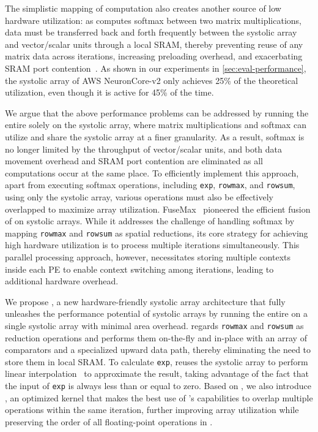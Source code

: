 The simplistic mapping of computation also creates another source of low hardware utilization:
as \FA{} computes softmax between two matrix multiplications, data must be transferred
back and forth frequently between the systolic array and vector/scalar units through a local SRAM,
thereby preventing reuse of any matrix data across iterations,
increasing preloading overhead, and exacerbating SRAM port contention~\cite{virgo,mosaic}.
As shown in our experiments in \autoref{sec:eval-performance}, the 
systolic array of AWS NeuronCore-v2 only achieves 25\% of the
theoretical \FLOPs{} utilization, even though it is active for 45\% of the time.

We argue that the above performance problems can be addressed by running the entire \FA{}
solely on the systolic array, where matrix multiplications and softmax can utilize and share the systolic array \FLOPs{} at a finer granularity.
As a result, softmax is no longer limited by the throughput of vector/scalar units, and both
data movement overhead and SRAM port contention are eliminated as all computations occur at the same place.
To efficiently implement this approach, apart from executing softmax operations, including \texttt{exp}, \texttt{rowmax}, and \texttt{rowsum},
using only the systolic array, various operations must also be effectively overlapped to maximize array utilization.
FuseMax~\cite{fusemax} pioneered the efficient fusion of \FA{} on systolic arrays.
While it addresses the challenge of handling softmax by mapping \texttt{rowmax} and \texttt{rowsum} as spatial reductions,
its core strategy for achieving high hardware utilization is to process multiple \FA{} iterations simultaneously.
This parallel processing approach, however, necessitates storing multiple contexts inside each PE to enable context switching
among iterations, leading to additional hardware overhead.

We propose \emph{\MSAGA{}}, a new hardware-friendly systolic array architecture that
fully unleashes the performance potential of systolic arrays by running the entire \FA{}
on a single systolic array with minimal area overhead.
\MSAGA{} regards \texttt{rowmax} and \texttt{rowsum} as reduction operations and
performs them on-the-fly and in-place with an array of comparators and a specialized upward data path, thereby eliminating the
need to store them in local SRAM.
To calculate \texttt{exp}, \MSAGA{} reuses the systolic array to perform linear interpolation~\cite{exp_pwl}
to approximate the result, taking advantage of the fact that the input of \texttt{exp} is always less than or equal to zero.
Based on \MSAGA{}, we also introduce \emph{\SA{}},
an optimized kernel that makes the best use of \MSAGA{}'s capabilities to overlap
multiple operations within the same \FA{} iteration,
further improving array utilization while preserving the
order of all floating-point operations in \FA{}.

